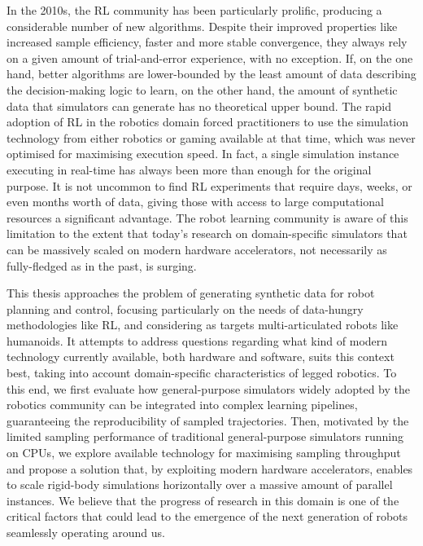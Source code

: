 In the 2010s, the \ac{RL} community has been particularly prolific, producing a considerable number of new algorithms.
Despite their improved properties like increased sample efficiency, faster and more stable convergence, \etc they always rely on a given amount of trial-and-error experience, with no exception.
If, on the one hand, better algorithms are lower-bounded by the least amount of data describing the decision-making logic to learn, on the other hand, the amount of synthetic data that simulators can generate has no theoretical upper bound.
The rapid adoption of \ac{RL} in the robotics domain forced practitioners to use the simulation technology from either robotics or gaming available at that time, which was never optimised for maximising execution speed.
In fact, a single simulation instance executing in real-time has always been more than enough for the original purpose.
It is not uncommon to find \ac{RL} experiments that require days, weeks, or even months worth of data, giving those with access to large computational resources a significant advantage.
The robot learning community is aware of this limitation to the extent that today's research on domain-specific simulators that can be massively scaled on modern hardware accelerators, not necessarily as fully-fledged as in the past, is surging.

\vspace{3mm}
This thesis approaches the problem of generating synthetic data for robot planning and control, focusing particularly on the needs of data-hungry methodologies like \ac{RL}, and considering as targets multi-articulated robots like humanoids.
It attempts to address questions regarding what kind of modern technology currently available, both hardware and software, suits this context best, taking into account domain-specific characteristics of legged robotics.
To this end, we first evaluate how general-purpose simulators widely adopted by the robotics community can be integrated into complex learning pipelines, guaranteeing the reproducibility of sampled trajectories.
Then, motivated by the limited sampling performance of traditional general-purpose simulators running on \acp{CPU}, we explore available technology for maximising sampling throughput and propose a solution that, by exploiting modern hardware accelerators, enables to scale rigid-body simulations horizontally over a massive amount of parallel instances.
We believe that the progress of research in this domain is one of the critical factors that could lead to the emergence of the next generation of robots seamlessly operating around us.

